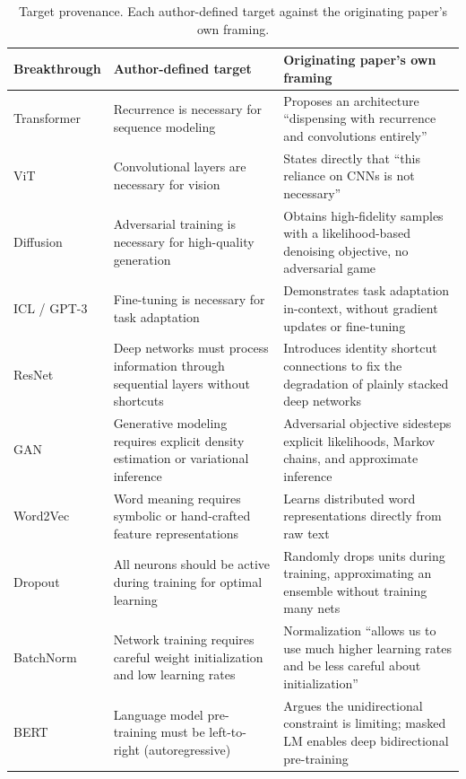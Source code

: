 \documentclass[11pt]{article}
\begin{document}
\begin{table}[t]
\centering
\caption{Target provenance. Each author-defined target against the originating paper's own framing.}
\label{tab:targetprov}
\footnotesize
\setlength{\tabcolsep}{4pt}
\begin{tabular}{@{}l>{\raggedright\arraybackslash}p{5.0cm}>{\raggedright\arraybackslash}p{7.4cm}@{}}
\toprule
Breakthrough & Author-defined target & Originating paper's own framing \\
\midrule
Transformer~\citeyearpar{vaswani2017attention} & Recurrence is necessary for sequence modeling & Proposes an architecture ``dispensing with recurrence and convolutions entirely'' \\
ViT~\citeyearpar{dosovitskiy2021image} & Convolutional layers are necessary for vision & States directly that ``this reliance on CNNs is not necessary'' \\
Diffusion~\citeyearpar{ho2020denoising} & Adversarial training is necessary for high-quality generation & Obtains high-fidelity samples with a likelihood-based denoising objective, no adversarial game \\
ICL / GPT-3~\citeyearpar{brown2020language} & Fine-tuning is necessary for task adaptation & Demonstrates task adaptation in-context, without gradient updates or fine-tuning \\
ResNet~\citeyearpar{he2016deep} & Deep networks must process information through sequential layers without shortcuts & Introduces identity shortcut connections to fix the degradation of plainly stacked deep networks \\
GAN~\citeyearpar{goodfellow2014generative} & Generative modeling requires explicit density estimation or variational inference & Adversarial objective sidesteps explicit likelihoods, Markov chains, and approximate inference \\
Word2Vec~\citeyearpar{mikolov2013distributed} & Word meaning requires symbolic or hand-crafted feature representations & Learns distributed word representations directly from raw text \\
Dropout~\citeyearpar{srivastava2014dropout} & All neurons should be active during training for optimal learning & Randomly drops units during training, approximating an ensemble without training many nets \\
BatchNorm~\citeyearpar{ioffe2015batch} & Network training requires careful weight initialization and low learning rates & Normalization ``allows us to use much higher learning rates and be less careful about initialization'' \\
BERT~\citeyearpar{devlin2019bert} & Language model pre-training must be left-to-right (autoregressive) & Argues the unidirectional constraint is limiting; masked LM enables deep bidirectional pre-training \\
\bottomrule
\end{tabular}
\end{table}
\end{document}
